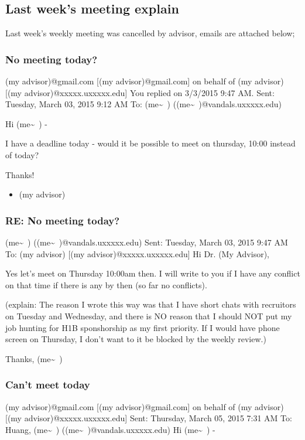 \documentclass[9pt,b5paper]{article}
\begin{document}
\subsection{Last week's meeting explain}
\label{sec-2-3}
Last week's weekly meeting was cancelled by advisor, emails are attached below;

\subsubsection{No meeting today?}
\label{sec-2-3-1}
(my advisor)@gmail.com [(my advisor)@gmail.com] on behalf of (my advisor) [(my advisor)@xxxxx.uxxxxx.edu]
You replied on 3/3/2015 9:47 AM.
Sent:        Tuesday, March 03, 2015 9:12 AM
To:        (me\textasciitilde{}~) ((me\textasciitilde{}~)@vandals.uxxxxx.edu)

Hi (me\textasciitilde{}~) - 

I have a deadline today - would it be possible to meet on thursday, 10:00 instead of today?

Thanks!

\begin{itemize}
\item (my advisor)
\end{itemize}
\subsubsection{RE: No meeting today?}
\label{sec-2-3-2}
(me\textasciitilde{}~) ((me\textasciitilde{}~)@vandals.uxxxxx.edu)
Sent:        Tuesday, March 03, 2015 9:47 AM
To:        
(my advisor) [(my advisor)@xxxxx.uxxxxx.edu]
Hi Dr. (My Advisor), 

Yes let's meet on Thursday 10:00am then. I will write to you if I have any conflict on that time if there is any by then (so far no conflicts). 

(explain: The reason I wrote this way was that I have short chats with recruitors on Tuesday and Wednesday, and there is NO reason that I should NOT put my job hunting for H1B sponshorship as my first priority. If I would have phone screen on Thursday, I don't want to it be blocked by the weekly review.)

Thanks,
(me\textasciitilde{}~)
\subsubsection{Can't meet today}
\label{sec-2-3-3}
(my advisor)@gmail.com [(my advisor)@gmail.com] on behalf of (my advisor) [(my advisor)@xxxxx.uxxxxx.edu]
Sent:        Thursday, March 05, 2015 7:31 AM
To:        
Huang, (me\textasciitilde{}~) ((me\textasciitilde{}~)@vandals.uxxxxx.edu)
Hi (me\textasciitilde{}~) - 
\end{document}
